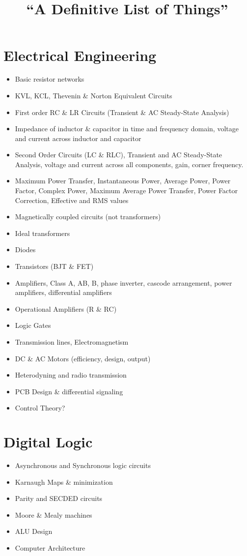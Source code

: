 \documentclass[a4paper]{article}
\begin{document}
\title{``A Definitive List of Things''}

\section{Electrical Engineering}
\begin{itemize}
\item Basic resistor networks
\item KVL, KCL, Thevenin \& Norton Equivalent Circuits
\item First order RC \& LR Circuits (Transient \& AC Steady-State Analysis)
\item Impedance of inductor \& capacitor in time and frequency domain, voltage
  and current across inductor and capacitor
\item Second Order Circuits (LC \& RLC), Transient and AC Steady-State Analysis,
  voltage and current across all components, gain, corner frequency.
\item Maximum Power Transfer, Instantaneous Power, Average Power, Power Factor,
  Complex Power, Maximum Average Power Transfer, Power Factor Correction,
  Effective and RMS values
\item Magnetically coupled circuits (not transformers)
\item Ideal transformers
\item Diodes
\item Transistors (BJT \& FET)
\item Amplifiers, Class A, AB, B, phase inverter, cascode arrangement, power
  amplifiers, differential amplifiers
\item Operational Amplifiers (R \& RC)
\item Logic Gates
\item Transmission lines, Electromagnetism
\item DC \& AC Motors (efficiency, design, output)
\item Heterodyning and radio transmission
\item PCB Design \& differential signaling
\item Control Theory?
\end{itemize}

\section{Digital Logic}
\begin{itemize}
\item Asynchronous and Synchronous logic circuits
\item Karnaugh Maps \& minimization
\item Parity and SECDED circuits
\item Moore \& Mealy machines
\item ALU Design
\item Computer Architecture
\end{itemize}
\end{document}
